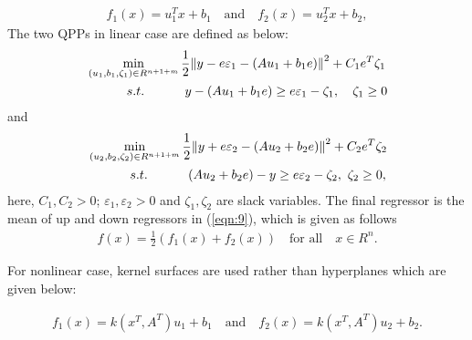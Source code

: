 \documentclass[pdflatex,sn-mathphys]{sn-jnl}%
\theoremstyle{thmstyleone}%
\theoremstyle{thmstyletwo}%
\theoremstyle{thmstylethree}%
\begin{document}
\begin{align}
\label{eqn:9}
f_1 (x)=u_{1}^{T} x+b_{1}  \quad \mbox{and} \quad f_{2} (x)=u_{2}^{T} x+b_{2},
\end{align}       
\noindent
The two QPPs in linear case are defined as below:
\begin{align}
& \mathop{\min }\limits_{(u_{1} ,b_{1} ,\zeta_1  )\in R^{n+1+m} } \frac{1}{2} \norm{y- e\varepsilon _{1} -(Au_{1} +b_{1} e)}^{2} +C_{1} e_{}^{T} \zeta_1   \notag\\
&  \, \quad\quad\quad s.t. \,\quad\quad \quad  y-(Au_{1} +b_{1} e)\ge e \varepsilon _{1} -\zeta_1, \quad \zeta_1  \ge 0
\end{align}
and
\begin{align}
& \mathop{\min }\limits_{(u_{2} ,b_{2} ,\zeta_2 )\in R^{n+1+m} } \frac{1}{2} \norm{y+e \varepsilon _{2} -(Au_{2} +b_{2} e)}^{2} +C_{2} e_{}^{T} \zeta_2 \notag \\
& \,\, \quad\quad  \quad s.t. \,\quad \quad \quad  (Au_{2} +b_{2} e)-y\ge  e \varepsilon _{2} -\zeta_2,~ \zeta_2 \ge 0,         
\end{align} 
 here, $C_{1} ,C_{2} >0$; $\varepsilon _{1} ,\varepsilon _{2} >0$ and $\zeta_1 ,\zeta_2 $ are slack variables.
The final regressor is the mean of up and down regressors in (\ref{eqn:9}), which is given as follows
\begin{align}
f(x)=\frac{1}{2} (f_{1} (x)+f_{2} (x)) \quad \mbox{for all} \quad x\in R^{n}.
\end{align}


For nonlinear case, kernel surfaces are used rather than hyperplanes which are given below:


\begin{align}
f_{1} (x)=k(x^{T} ,A^{T} )u_{1} +b_{1} \quad \mbox{and} \quad f_{2} (x)=k(x^{T} ,A^{T} )u_{2} +b_{2}.
\end{align}
\end{document}
